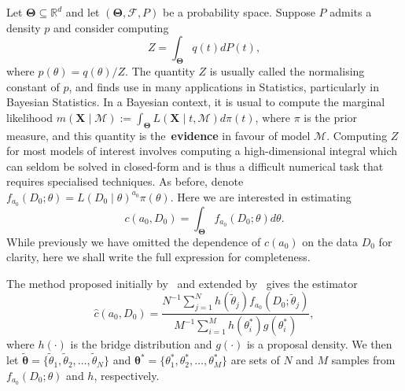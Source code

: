 \documentclass[a4paper, notitlepage, 11pt]{article}
\begin{document}
Let $\boldsymbol{\Theta} \subseteq \mathbb{R}^d$ and let $(\boldsymbol{\Theta}, \mathcal{F}, P)$ be a probability space.
Suppose $P$ admits a density $p$ and consider computing
\begin{equation}
\label{eq:norm_const}
\nonumber
 Z = \int_{\boldsymbol{\Theta}} q(t) dP(t),
\end{equation}
where $p(\theta) = q(\theta)/Z$.
The quantity $Z$ is usually called the normalising constant of $p$, and finds use in many applications in Statistics, particularly in Bayesian Statistics.
In a Bayesian context, it is usual to compute the marginal likelihood $m(\boldsymbol{X} \mid \mathcal{M}) := \int_{\boldsymbol{\Theta}} L(\boldsymbol{X} \mid t, \mathcal{M} ) d\pi(t)$, where $\pi$ is the prior measure, and this quantity is the~\textbf{evidence} in favour of model $\mathcal{M}$. 
Computing $Z$ for most models of interest involves computing a high-dimensional integral which can seldom be solved in closed-form and is thus a difficult numerical task that requires specialised techniques.
As before, denote $f_{a_0}(D_0; \theta) = L(D_0 \mid \theta)^{a_0} \pi(\theta)$.
Here we are interested in estimating
\begin{equation}
 \label{eq:marginal_like_power_prior}
 \nonumber
 c(a_0, D_0) = \int_{\boldsymbol{\Theta}} f_{a_0}(D_0; \theta) d\theta.
\end{equation}
While previously we have omitted the dependence of $c(a_0)$ on the data $D_0$ for clarity, here we shall write the full expression for completeness.

The method proposed initially by~\cite{Meng1996} and extended by~\cite{Meng2002} gives the estimator
\begin{equation}
\label{eq:brige_estimator}
  \hat{c}(a_0, D_0) = \frac{N^{-1}\sum_{j=1}^N h(\tilde{\theta}_j) f_{a_0}(D_0; \tilde{\theta}_j) }{M^{-1}\sum_{i=1}^M h(\theta_i^\ast) g(\theta_i^\ast) },
\end{equation}
where $h(\cdot)$ is the bridge distribution and $g(\cdot)$ is a proposal density.
We then let $\tilde{\boldsymbol{\theta}} = \{\tilde{\theta}_1, \tilde{\theta}_2, \ldots, \tilde{\theta}_N \}$ and $ \boldsymbol{\theta}^\ast = \{ \theta_1^\ast, \theta_2^\ast, \ldots, \theta_M^\ast  \}$ are sets of $N$ and $M$ samples from $f_{a_0}(D_0; \theta)$ and $h$, respectively.
\end{document}
